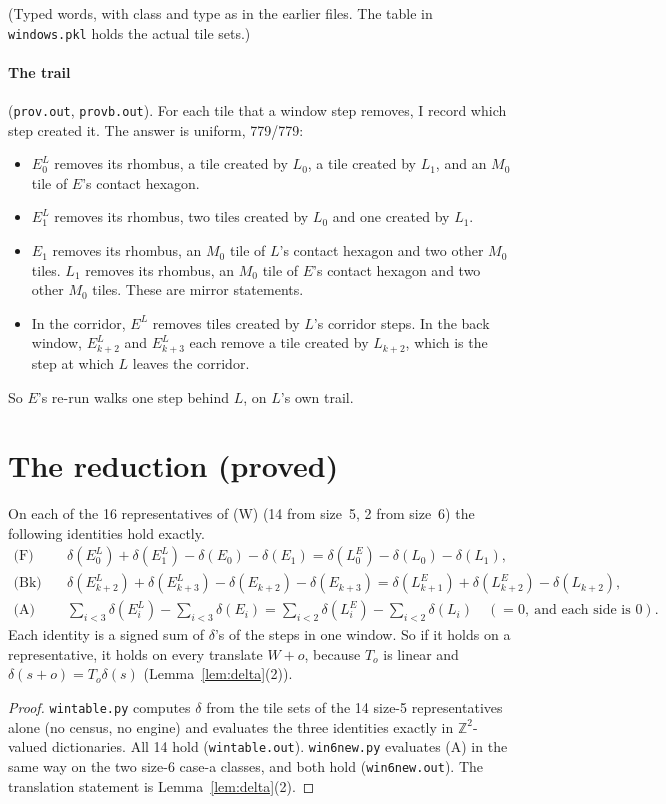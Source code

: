 \documentclass[11pt]{article}
\theoremstyle{definition}\newtheorem{definition}[theorem]{Definition}\newtheorem{remark}[theorem]{Remark}
\newcommand{\Z}{\mathbb Z}
\begin{document}
(Typed words, with class and type as in the earlier files. The table in \texttt{windows.pkl} holds the actual tile sets.)

\paragraph{The trail} (\texttt{prov.out}, \texttt{provb.out}). For each tile that a window step removes, I record which step created it. The answer is uniform, 779/779:
\begin{itemize}
\item $E^L_0$ removes its rhombus, a tile created by $L_0$, a tile created by $L_1$, and an $M_0$ tile of $E$'s contact hexagon.
\item $E^L_1$ removes its rhombus, two tiles created by $L_0$ and one created by $L_1$.
\item $E_1$ removes its rhombus, an $M_0$ tile of $L$'s contact hexagon and two other $M_0$ tiles. $L_1$ removes its rhombus, an $M_0$ tile of $E$'s contact hexagon and two other $M_0$ tiles. These are mirror statements.
\item In the corridor, $E^L$ removes tiles created by $L$'s corridor steps. In the back window, $E^L_{k+2}$ and $E^L_{k+3}$ each remove a tile created by $L_{k+2}$, which is the step at which $L$ leaves the corridor.
\end{itemize}
So $E$'s re-run walks one step behind $L$, on $L$'s own trail.

\section{The reduction (proved)}\label{sec:red}
\begin{lemma}\label{lem:win}
On each of the 16 representatives of (W) (14 from size~5, 2 from size~6) the following identities hold exactly.
\begin{align*}
\text{(F)}\quad&\delta(E^L_0)+\delta(E^L_1)-\delta(E_0)-\delta(E_1)=\delta(L^E_0)-\delta(L_0)-\delta(L_1),\\
\text{(Bk)}\quad&\delta(E^L_{k+2})+\delta(E^L_{k+3})-\delta(E_{k+2})-\delta(E_{k+3})=\delta(L^E_{k+1})+\delta(L^E_{k+2})-\delta(L_{k+2}),\\
\text{(A)}\quad&\textstyle\sum_{i<3}\delta(E^L_i)-\sum_{i<3}\delta(E_i)=\sum_{i<2}\delta(L^E_i)-\sum_{i<2}\delta(L_i)\quad(=0,\ \text{and each side is }0).
\end{align*}
Each identity is a signed sum of $\delta$'s of the steps in one window. So if it holds on a representative, it holds on every translate $W+o$, because $T_o$ is linear and $\delta(s+o)=T_o\delta(s)$ (Lemma~\ref{lem:delta}(2)).
\end{lemma}
\begin{proof}
\texttt{wintable.py} computes $\delta$ from the tile sets of the 14 size-5 representatives alone (no census, no engine) and evaluates the three identities exactly in $\Z^2$-valued dictionaries. All 14 hold (\texttt{wintable.out}). \texttt{win6new.py} evaluates (A) in the same way on the two size-6 case-a classes, and both hold (\texttt{win6new.out}). The translation statement is Lemma~\ref{lem:delta}(2).
\end{proof}
\end{document}
